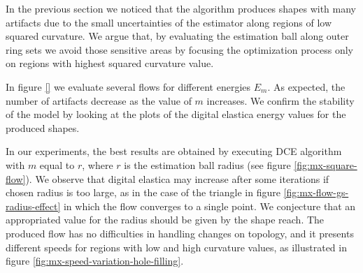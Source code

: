In the previous section we noticed that the algorithm produces shapes with many artifacts due to the small uncertainties
of the estimator along regions of low squared curvature. We argue that, by evaluating the estimation ball along outer
ring sets we avoid those sensitive areas by focusing the optimization process only on regions with highest squared
curvature value.

In figure \ref{} we evaluate several flows for different energies $E_m$. As expected, the number of artifacts decrease as the value of $m$ increases. We confirm the stability of the model by looking at the plots of the digital elastica energy values for the produced shapes.






In our experiments, the best results are obtained by executing DCE algorithm with $m$ equal to $r$, where $r$ is
  the estimation ball radius (see figure \ref{fig:mx-square-flow}). We observe that digital elastica may increase after some
  iterations if chosen radius is too large, as in the case of the triangle in figure \ref{fig:mx-flow-gs-radius-effect}
  in which the flow converges to a single point. We conjecture that an appropriated value for the radius should be given
  by the shape reach.  The produced flow has no difficulties in handling changes on topology, and it presents different
  speeds for regions with low and high curvature values, as illustrated in figure
  \ref{fig:mx-speed-variation-hole-filling}.

